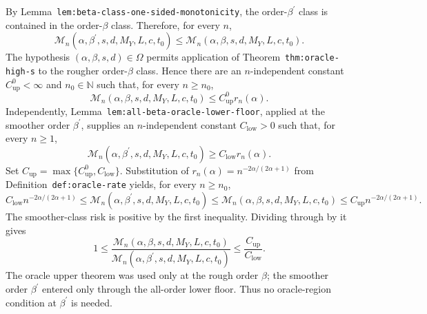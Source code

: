 By Lemma~\texttt{lem:beta-class-one-sided-monotonicity}, the order-\(\beta^{\prime}\) class is contained in the order-\(\beta\) class. Therefore, for every \(n\),
\[
\mathcal M_n(\alpha,\beta^{\prime},s,d,M_Y,L,c,t_0)
\le
\mathcal M_n(\alpha,\beta,s,d,M_Y,L,c,t_0).
\]
The hypothesis \((\alpha,\beta,s,d)\in\Omega\) permits application of Theorem~\texttt{thm:oracle-high-s} to the rougher order-\(\beta\) class. Hence there are an \(n\)-independent constant \(C_{\mathrm{up}}^0<\infty\) and \(n_0\in\mathbb N\) such that, for every \(n\ge n_0\),
\[
\mathcal M_n(\alpha,\beta,s,d,M_Y,L,c,t_0)
\le C_{\mathrm{up}}^0r_n(\alpha).
\]
Independently, Lemma~\texttt{lem:all-beta-oracle-lower-floor}, applied at the smoother order \(\beta^{\prime}\), supplies an \(n\)-independent constant \(C_{\mathrm{low}}>0\) such that, for every \(n\ge1\),
\[
\mathcal M_n(\alpha,\beta^{\prime},s,d,M_Y,L,c,t_0)
\ge C_{\mathrm{low}}r_n(\alpha).
\]
Set \(C_{\mathrm{up}}=\max\{C_{\mathrm{up}}^0,C_{\mathrm{low}}\}\). Substitution of \(r_n(\alpha)=n^{-2\alpha/(2\alpha+1)}\) from Definition~\texttt{def:oracle-rate} yields, for every \(n\ge n_0\),
\[
C_{\mathrm{low}}n^{-2\alpha/(2\alpha+1)}
\le \mathcal M_n(\alpha,\beta^{\prime},s,d,M_Y,L,c,t_0)
\le \mathcal M_n(\alpha,\beta,s,d,M_Y,L,c,t_0)
\le C_{\mathrm{up}}n^{-2\alpha/(2\alpha+1)}.
\]
The smoother-class risk is positive by the first inequality. Dividing through by it gives
\[
1\le
\frac{\mathcal M_n(\alpha,\beta,s,d,M_Y,L,c,t_0)}
{\mathcal M_n(\alpha,\beta^{\prime},s,d,M_Y,L,c,t_0)}
\le\frac{C_{\mathrm{up}}}{C_{\mathrm{low}}}.
\]
The oracle upper theorem was used only at the rough order \(\beta\); the smoother order \(\beta^{\prime}\) entered only through the all-order lower floor. Thus no oracle-region condition at \(\beta^{\prime}\) is needed.